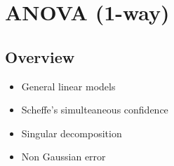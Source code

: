\documentclass[11pt,fleqn]{book} %
\begin{document}



\chapter{ANOVA (1-way)}

\section{Overview}

\begin{itemize}
	\item General linear models
	\item Scheffe's simulteaneous confidence
	\item Singular decomposition
	\item Non Gaussian error
\end{itemize}




\end{document}
